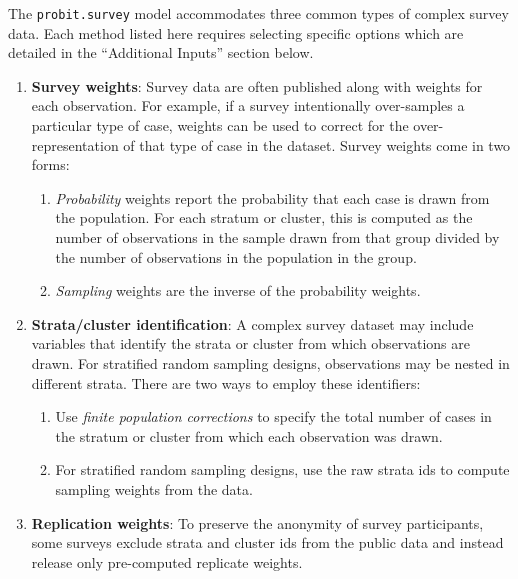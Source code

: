 The {\tt probit.survey} model accommodates three common types of 
complex survey data.  Each method listed here requires selecting 
specific options which are detailed in the ``Additional Inputs'' 
section below.  \begin{enumerate}

\item \textbf{Survey weights}:  Survey data are often published along
with weights for each observation.  For example, if a survey
intentionally over-samples a particular type of case, weights can be
used to correct for the over-representation of that type of case in
the dataset. Survey weights come in two forms:
\begin{enumerate}

\item \textit{Probability} weights report the probability that each
case is drawn from the population.  For each stratum or cluster, 
this is computed as the number of observations in the sample drawn 
from that group divided by the number of observations in the 
population in the group.

\item \textit{Sampling} weights are the inverse of the probability
weights.   

\end{enumerate}

\item \textbf{Strata/cluster identification}:  A complex survey 
dataset may include variables that identify the strata or cluster 
from which observations are drawn.  For stratified random sampling 
designs, observations may be nested in different strata.  There are 
two ways to employ these identifiers:

\begin{enumerate}

\item Use \textit{finite population corrections} to specify the
total number of cases in the stratum or cluster from which each
observation was drawn.

\item For stratified random sampling designs, use the raw strata ids
to compute sampling weights from the data.

\end{enumerate}

\item \textbf{Replication weights}: To preserve the anonymity of
survey participants, some surveys exclude strata and cluster ids 
from the public data and instead release only pre-computed replicate 
weights.

\end{enumerate}

